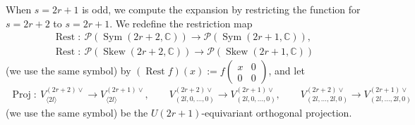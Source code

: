\documentclass[pdftex]{sigma}
\numberwithin{equation}{section}
\newcommand{\BC}{\mathbb{C}}
\newcommand{\cP}{\mathcal{P}}
\newcommand{\Proj}{\operatorname{Proj}}
\newcommand{\Sym}{\operatorname{Sym}}
\newcommand{\Skew}{\operatorname{Skew}}
\newcommand{\Rest}{\operatorname{Rest}}
\begin{document}
When $s=2r+1$ is odd, we compute the expansion by restricting the function for $s=2r+2$ to $s=2r+1$.
We redefine the restriction map
\begin{gather*}
 \Rest\colon \ \cP(\Sym(2r+2,\BC))\longrightarrow\cP(\Sym(2r+1,\BC)),\\
 \Rest\colon \ \cP(\Skew(2r+2,\BC))\longrightarrow\cP(\Skew(2r+1,\BC))
\end{gather*}
(we use the same symbol) by $(\Rest f)(x):=f\left(\begin{smallmatrix}x&0\\0&0\end{smallmatrix}\right)$, and let
\begin{gather*} \Proj\colon \ V_{\langle 2l\rangle}^{(2r+2)\vee}\longrightarrow V_{\langle 2l\rangle}^{(2r+1)\vee},\qquad
V_{(2l,0,\ldots,0)}^{(2r+2)\vee}\longrightarrow V_{(2l,0,\ldots,0)}^{(2r+1)\vee},\qquad
V_{(2l,\ldots,2l,0)}^{(2r+2)\vee}\longrightarrow V_{(2l,\ldots,2l,0)}^{(2r+1)\vee} \end{gather*}
(we use the same symbol) be the $U(2r+1)$-equivariant orthogonal projection.
\end{document}
